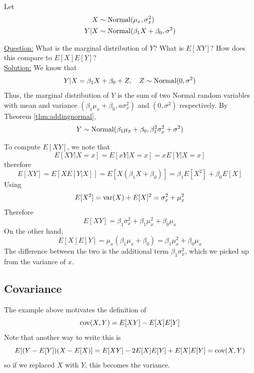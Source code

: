  
 \begin{example}\label{ex:firstreg}
Let
\begin{align*}
X &\sim {\rm Normal}(\mu_x,\sigma_x^2)\\
Y|X &\sim {\rm Normal}(\beta_1X + \beta_0,\sigma^2)
\end{align*}

 \noindent
\underline{Question:} What is the marginal distribution of $Y$? What is $E[XY]$? How does this compare to $E[X]E[Y]$?\\


 \noindent
\underline{Solution:} We know that 
\begin{equation*}
Y|X =\beta_1X+\beta_0 + Z,\quad Z \sim {\rm Normal}(0,\sigma^2)
\end{equation*}
Thus, the marginal distribution of $Y$ is the sum of two Normal random variables with mean and variance $(\beta_1\mu_x+\beta_0,a\sigma_x^2)$ and $(0,\sigma^2)$ respectively. 
By Theorem \ref{thm:addingnormal}, 
\begin{equation*}
Y  \sim {\rm Normal}(\beta_1\mu_x+\beta_0,\beta_1^2\sigma_x^2 + \sigma^2)
\end{equation*}

To compute $E[XY]$, we note that 
\begin{equation*}
E[XY|X=x]=  E[xY|X=x]= xE[Y|X=x]
\end{equation*}
therefore
\begin{equation*}
E[XY] = E[XE[Y|X]] = E[X(\beta_1X+\beta_0)] = \beta_1E[X^2]+\beta_0E[X]
\end{equation*}
Using 
\begin{equation*}
E[X^2] = {\rm var}(X) + E[X]^2 = \sigma_x^2 + \mu_x^2
\end{equation*}
Therefore 
\begin{equation*}
E[XY] =  \beta_1\sigma_x^2 + \beta_1\mu_x^2 + \beta_0\mu_x
\end{equation*}
On the other hand, 
\begin{equation*}
E[X]E[Y] = \mu_x(\beta_1\mu_x+\beta_0) = \beta_1 \mu_x^2 +\beta_0 \mu_x
\end{equation*}
The difference between the two is the additional term $\beta_1\sigma_x^2$, which we picked up from the variance of $x$.  


\end{example}


\subsection{Covariance} 
 The example above motivates the definition of 
\begin{equation}
{\rm cov}(X,Y) = E[XY]-E[X]E[Y]
\end{equation}
Note that another way to write this is 
\begin{equation*}
 E[(Y-E[Y])(X-E[X)] = E[XY] - 2E[X]E[Y]+E[X]E[Y] = {\rm cov}(X,Y)
\end{equation*}
so if we replaced $X$ with $Y$, this becomes the variance. 
 

